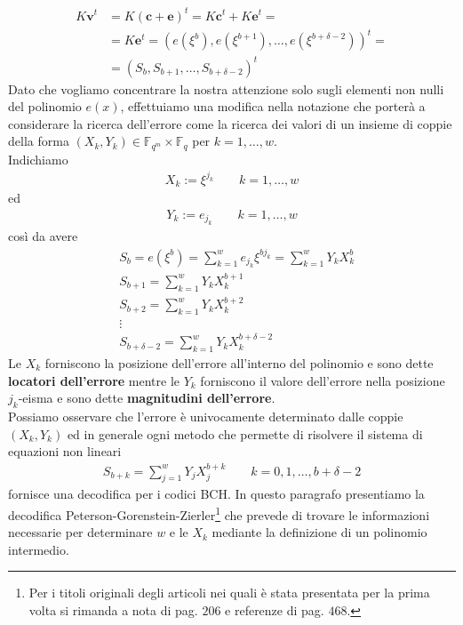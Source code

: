 \begin{align*}
   K \mathbf{v}^{t} &=  K (\mathbf{c} + \mathbf{e})^{t} = K \mathbf{c}^{t} + K \mathbf{e}^{t} = \\
                    &=  K \mathbf{e}^{t} = (e(\xi^{b}), e(\xi^{b+1}), \dots , e(\xi^{b + \delta - 2}))^{t}=
                    \\
                    &=  (S_{b}, S_{b+1}, \dots , S_{b + \delta - 2})^{t}
\end{align*}
Dato che vogliamo concentrare la nostra attenzione solo sugli elementi non nulli del polinomio $e(x)$, effettuiamo una modifica nella notazione che porterà a considerare la ricerca dell'errore come la ricerca dei valori di un insieme di coppie della forma $(X_{k},Y_{k}) \in \mathbb{F}_{q^{m}} \times \mathbb{F}_{q}$ per $k=1, \dots , w$.\\
Indichiamo
\begin{align*}
   X_{k} := \xi^{j_{k}} \qquad k = 1, \dots , w
\end{align*}
ed
\begin{align*}
   Y_{k} := e_{j_{k}} \qquad k = 1, \dots , w
\end{align*}
così da avere
\begin{align*}
   &S_{b} = e(\xi^{b}) = \sum_{k=1}^{w} e_{j_{k}} \xi^{b j_{k}}
           = \sum_{k=1}^{w} Y_{k}X_{k}^{b} \\
   &S_{b+1} = \sum_{k=1}^{w} Y_{k}X_{k}^{b+1} \\
   &S_{b+2} = \sum_{k=1}^{w} Y_{k}X_{k}^{b+2} \\
   &  \vdots  \\
   &S_{b + \delta - 2} = \sum_{k=1}^{w} Y_{k}X_{k}^{b + \delta - 2}
\end{align*}
Le $X_{k}$ forniscono la posizione dell'errore all'interno del polinomio e sono dette {\bf locatori dell'errore} mentre le $Y_{k}$ forniscono il valore dell'errore nella posizione $j_{k}$-eisma
e sono dette {\bf magnitudini dell'errore}.\\
Possiamo osservare che l'errore è univocamente determinato dalle coppie $(X_{k},Y_{k})$ ed in generale ogni metodo che permette di risolvere il sistema di equazioni non lineari
\begin{align}\label{sis:sistemaSYX}
   S_{b+k} = \sum_{j=1}^{w}Y_{j}X_{j}^{b+k} \qquad k = 0, 1, \dots, b + \delta - 2
\end{align}
fornisce una decodifica per i codici BCH. In questo paragrafo presentiamo la decodifica Peterson-Gorenstein-Zierler\footnote{Per i titoli originali degli articoli nei quali è stata presentata per la prima volta si rimanda a \cite{blahut} nota di pag. $206$ e referenze di pag. $468$. } che prevede di trovare le informazioni necessarie per determinare $w$ e le $X_{k}$ mediante la definizione di un polinomio intermedio.
